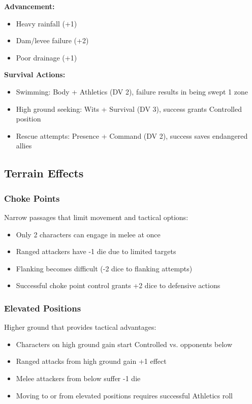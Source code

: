 \documentclass[11pt,letterpaper]{article}
\begin{document}
\textbf{Advancement:}
\begin{itemize}[leftmargin=*]
    \item Heavy rainfall (+1)
    \item Dam/levee failure (+2)
    \item Poor drainage (+1)
\end{itemize}

\textbf{Survival Actions:}
\begin{itemize}[leftmargin=*]
    \item Swimming: Body + Athletics (DV 2), failure results in being swept 1 zone
    \item High ground seeking: Wits + Survival (DV 3), success grants Controlled position
    \item Rescue attempts: Presence + Command (DV 2), success saves endangered allies
\end{itemize}

\subsection{Terrain Effects}

\subsubsection{Choke Points}

Narrow passages that limit movement and tactical options:
\begin{itemize}[leftmargin=*]
    \item Only 2 characters can engage in melee at once
    \item Ranged attackers have -1 die due to limited targets
    \item Flanking becomes difficult (-2 dice to flanking attempts)
    \item Successful choke point control grants +2 dice to defensive actions
\end{itemize}

\subsubsection{Elevated Positions}

Higher ground that provides tactical advantages:
\begin{itemize}[leftmargin=*]
    \item Characters on high ground gain start Controlled vs. opponents below
    \item Ranged attacks from high ground gain +1 effect
    \item Melee attackers from below suffer -1 die
    \item Moving to or from elevated positions requires successful Athletics roll
\end{itemize}
\end{document}
